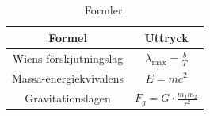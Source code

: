 \begin{table}[h!]
    \def\arraystretch{1.5}
    \centering
    \caption{Formler.}\vspace{5pt}
    \begin{tabular}{c | c}
        \textbf{Formel} & \textbf{Uttryck} \\ \midrule
        Wiens förskjutningslag & $\displaystyle \lambda_\text{max} = \frac{b}{T}$ \\
        Massa-energiekvivalens & $\displaystyle E = mc^2$\\
        Gravitationslagen & $\displaystyle F_g = G\cdot\frac{m_1m_2}{r^2}$
    \end{tabular}

\end{table}